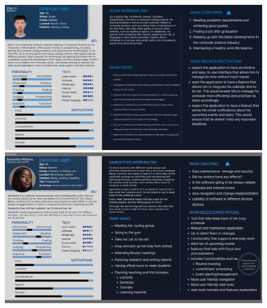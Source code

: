 \documentclass[a4paper]{article}
\begin{document}
\begin{figure}[H] %
	\centering %
	\includegraphics[width=1\textwidth]{./images/Persona_Zijun.jpg} %
	\includegraphics[width=1\textwidth]{./images/Persona_Chance.jpg}
	\caption*{} %
	\label{Fig.Personas1} %
\end{figure}

\newpage
\end{document}
